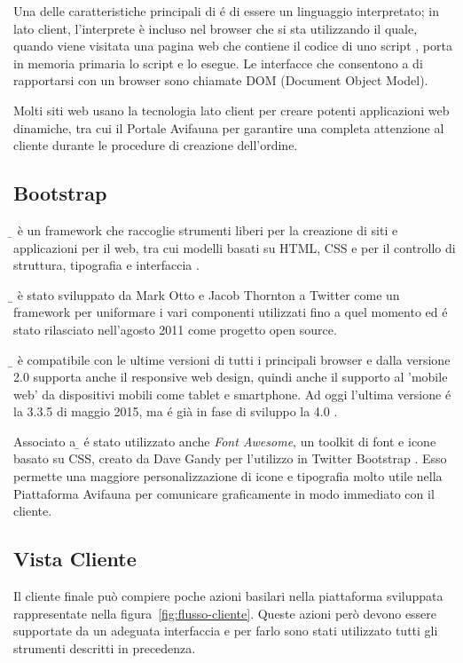 Una delle caratteristiche principali di {\js} é di essere un linguaggio interpretato; in {\js} lato client, l'interprete è incluso nel browser che si sta utilizzando il quale, quando viene visitata una pagina web che contiene il codice di uno script {\js}, porta in memoria primaria lo script e lo esegue. Le interfacce che consentono a {\js} di rapportarsi con un browser sono chiamate DOM (Document Object Model). 

Molti siti web usano la tecnologia {\js} lato client per creare potenti applicazioni web dinamiche, tra cui il Portale Avifauna per garantire una completa attenzione al cliente durante le procedure di creazione dell'ordine.

\subsection{Bootstrap}
\label{subs:bootstrap}
\emph{{\b}} è un framework che raccoglie strumenti liberi per la creazione di siti e applicazioni per il web, tra cui modelli basati su HTML, CSS e {\js} per il controllo di struttura, tipografia e interfaccia \cite{bootstrap}.

{\b} è stato sviluppato da Mark Otto e Jacob Thornton a Twitter come un framework per uniformare i vari componenti utilizzati fino a quel momento ed é stato rilasciato nell'agosto 2011 come progetto open source.

{\b} è compatibile con le ultime versioni di tutti i principali browser e dalla versione 2.0 supporta anche il responsive web design, quindi anche il supporto al 'mobile web' da dispositivi mobili come tablet e smartphone. Ad oggi l'ultima versione é la 3.3.5 di maggio 2015, ma é già in fase di sviluppo la 4.0 \cite{bootstrap-github}.

Associato a {\b} é stato utilizzato anche \emph{Font Awesome}, un toolkit di font e icone basato su CSS, creato da Dave Gandy per l'utilizzo in Twitter Bootstrap \cite{fontawesome} \cite{fontawesome-github}. Esso permette una maggiore personalizzazione di icone e tipografia molto utile nella Piattaforma Avifauna per comunicare graficamente in modo immediato con il cliente.

\newpage
\subsection{Vista Cliente}
\label{subs:cliente}
Il cliente finale può compiere poche azioni basilari nella piattaforma sviluppata rappresentate nella figura~\ref{fig:flusso-cliente}. Queste azioni però devono essere supportate da un adeguata interfaccia e per farlo sono stati utilizzato tutti gli strumenti descritti in precedenza.

